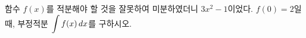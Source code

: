 함수 $f(x)$를 적분해야 할 것을 잘못하여 미분하였더니 $3x^2-1$이었다. $f(0)=2$일 때, 부정적분 $\displaystyle\int f(x)\mkern3mu dx$를 구하시오.
